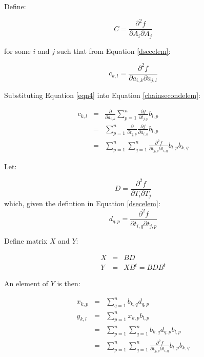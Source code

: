 \documentclass{report}
\begin{document}
Define:

\begin{equation}
C = \frac{\partial^2 f}{\partial A_i \partial A_j}
\end{equation}

for some $i$ and $j$ such that from Equation \ref{dsecelem}:

\begin{equation}
\label{chainsecondelem}
c_{k,l} = \frac{\partial^2 f}{\partial a_{i,k} \partial a_{j,l}}
\end{equation}

Substituting Equation \ref{eqn4} into Equation \ref{chainsecondelem}:

\begin{eqnarray}
c_{k,l} &=& \frac{\partial}{\partial a_{i,k}} \sum_{p=1}^n \frac{ \partial f}{\partial t_{j,p}} b_{l,p} \\
        &=& \sum_{p=1}^n \frac{\partial}{\partial t_{j,p}} \frac{\partial f}{\partial a_{i,k}} b_{l,p} \\
\label{chainsecondr1}
        &=& \sum_{p=1}^n \sum_{q=1}^n \frac{\partial^2 f}{ \partial t_{j,p} \partial t_{i,q}} b_{l,p} b_{k,q} 
\end{eqnarray}

Let:

\begin{equation}
D = \frac{\partial^2 f}{\partial T_i \partial T_j}
\end{equation}
which, given the defintion in Equation \ref{dsecelem}:
\begin{equation}
d_{q,p} = \frac{\partial^2 f}{\partial t_{i,q} \partial t_{j,p}}
\end{equation}

Define matrix $X$ and $Y$:

\begin{eqnarray}
X &=& B D \\
Y &=& X B^t = B D B^t
\end{eqnarray}

An element of $Y$ is then:

\begin{eqnarray}
x_{k,p} & = & \sum_{q=1}^n b_{k,q} d_{q,p} \\
y_{k,l} & = & \sum_{p=1}^n x_{k,p} b_{l,p} \\ 
        & = & \sum_{p=1}^n \sum_{q=1}^n b_{k,q} d_{q,p} b_{l,p} \\
\label{chainsecondr2}
        & = & \sum_{p=1}^n \sum_{q=1}^n \frac{\partial^2 f}{\partial t_{j,p} \partial t_{i,q}} b_{l,p} b_{k,q}
\end{eqnarray}
\end{document}
